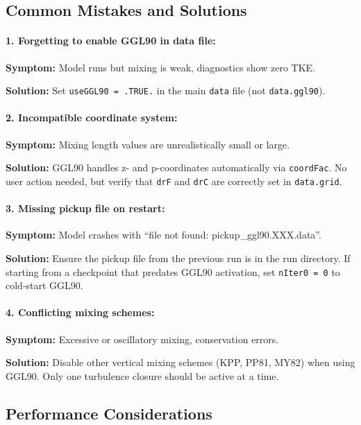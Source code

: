 \documentclass[12pt,letterpaper]{article}
\begin{document}
\subsection{Common Mistakes and Solutions}

\paragraph{1. Forgetting to enable GGL90 in data file:}

\textbf{Symptom:} Model runs but mixing is weak, diagnostics show zero TKE.

\textbf{Solution:} Set \verb|useGGL90 = .TRUE.| in the main \verb|data| file (not \verb|data.ggl90|).

\paragraph{2. Incompatible coordinate system:}

\textbf{Symptom:} Mixing length values are unrealistically small or large.

\textbf{Solution:} GGL90 handles z- and p-coordinates automatically via \verb|coordFac|. No user action needed, but verify that \verb|drF| and \verb|drC| are correctly set in \verb|data.grid|.

\paragraph{3. Missing pickup file on restart:}

\textbf{Symptom:} Model crashes with ``file not found: pickup_ggl90.XXX.data''.

\textbf{Solution:} Ensure the pickup file from the previous run is in the run directory. If starting from a checkpoint that predates GGL90 activation, set \verb|nIter0 = 0| to cold-start GGL90.

\paragraph{4. Conflicting mixing schemes:}

\textbf{Symptom:} Excessive or oscillatory mixing, conservation errors.

\textbf{Solution:} Disable other vertical mixing schemes (KPP, PP81, MY82) when using GGL90. Only one turbulence closure should be active at a time.

\subsection{Performance Considerations}
\end{document}
